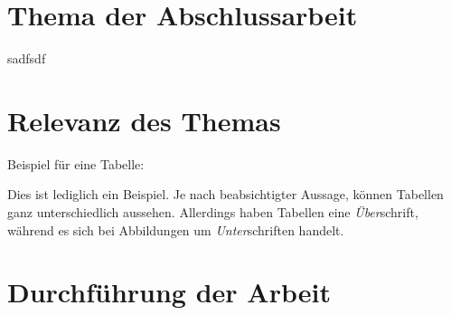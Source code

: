 \section{Thema der Abschlussarbeit}
sadfsdf
\section{Relevanz des Themas}
Beispiel für eine Tabelle:

\noindent{}Dies ist lediglich ein Beispiel. Je nach beabsichtigter Aussage, können Tabellen ganz unterschiedlich aussehen. Allerdings haben Tabellen eine \emph{Über}schrift, während es sich bei Abbildungen um \emph{Unter}schriften handelt.

\section{Durchführung der Arbeit}
